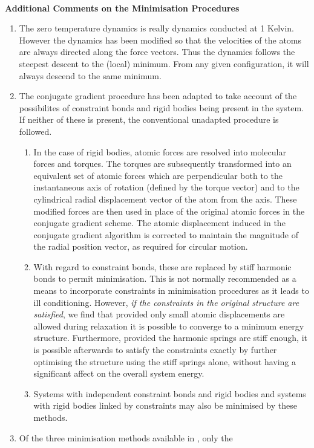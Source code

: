 {{~

{\bf Additional Comments on the Minimisation Procedures} 

\begin{enumerate} 
\item The zero temperature dynamics is really dynamics conducted at 1
Kelvin. However the dynamics has been modified so that the velocities
of the atoms are always directed along the force vectors. Thus the
dynamics follows the steepest descent to the (local) minimum. From any
given configuration, it will always descend to the same minimum.
\item The conjugate gradient procedure has been adapted to take
account of the possibilites of constraint bonds and rigid bodies being
present in the system. If neither of these is present, the
conventional unadapted procedure is followed.
\begin{enumerate}
\item In the case of rigid bodies, atomic forces are
resolved into molecular forces and torques. The torques are
subsequently transformed into an equivalent set of atomic forces which
are perpendicular both to the instantaneous axis of rotation (defined
by the torque vector) and to the cylindrical radial displacement
vector of the atom from the axis. These modified forces are then used
in place of the original atomic forces in the conjugate gradient
scheme. The atomic displacement induced in the conjugate gradient
algorithm is corrected to maintain the magnitude of the radial
position vector, as required for circular motion.
\item With regard to constraint bonds, these are replaced by stiff
harmonic bonds to permit minimisation. This is not normally
recommended as a means to incorporate constraints in minimisation
procedures as it leads to ill conditioning. However, {\it if the
constraints in the original structure are satisfied}, we find that
provided only small atomic displacements are allowed during relaxation
it is possible to converge to a minimum energy structure. Furthermore,
provided the harmonic springs are stiff enough, it is possible
afterwards to satisfy the constraints exactly by further optimising
the structure using the stiff springs alone, without having a
significant affect on the overall system energy.
\item Systems with independent constraint bonds and rigid bodies 
and systems with rigid bodies linked by constraints may also be
minimised by these methods.
\end{enumerate}
\item Of the three minimisation methods available in \D{}, only the

\end{enumerate}}}
